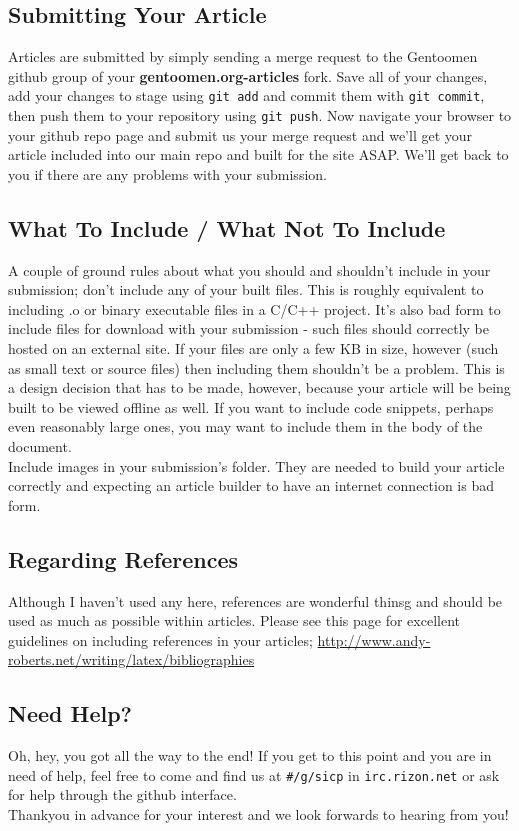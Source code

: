 \documentclass{amsart}
\begin{document}
\subsection{Submitting Your Article}
  Articles are submitted by simply sending a merge request to the Gentoomen github group of your \textbf{gentoomen.org-articles} fork. Save all of your changes, add your changes to stage using \texttt{git add} and commit them with \texttt{git commit}, then push them to your repository using \texttt{git push}. Now navigate your browser to your github repo page and submit us your merge request and we'll get your article included into our main repo and built for the site ASAP. We'll get back to you if there are any problems with your submission.
\subsection{What To Include / What Not To Include}
  A couple of ground rules about what you should and shouldn't include in your submission; don't include any of your built files. This is roughly equivalent to including .o or binary executable files in a C/C++ project. It's also bad form to include files for download with your submission - such files should correctly be hosted on an external site. If your files are only a few KB in size, however (such as small text or source files) then including them shouldn't be a problem. This is a design decision that has to be made, however, because your article will be being built to be viewed offline as well. If you want to include code snippets, perhaps even reasonably large ones, you may want to include them in the body of the document. \\
  Include images in your submission's folder. They are needed to build your article correctly and expecting an article builder to have an internet connection is bad form.
\subsection{Regarding References}
  Although I haven't used any here, references are wonderful thinsg and should be used as much as possible within articles. Please see this page for excellent guidelines on including references in your articles; \url{http://www.andy-roberts.net/writing/latex/bibliographies}
\subsection{Need Help?}
  Oh, hey, you got all the way to the end! If you get to this point and you are in need of help, feel free to come and find us at \texttt{\#/g/sicp} in \texttt{irc.rizon.net} or ask for help through the github interface. \\
  Thankyou in advance for your interest and we look forwards to hearing from you!
\end{document}
